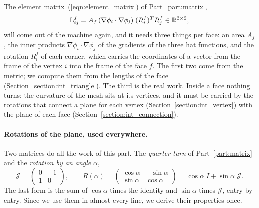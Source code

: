 The element matrix~(\ref{eqn:element_matrix}) of Part~\ref{part:matrix},
\begin{equation*}
\mathrm L^f_{ij} = A_f\,(\nabla\phi_i\cdot\nabla\phi_j)\; (R_i^f)^T R_j^f \in \mathbb{R}^{2\times 2},
\end{equation*}
will come out of the machine again, and it needs three things per face: an area $A_f$, the inner products $\nabla\phi_i \cdot \nabla\phi_j$ of the gradients of the three hat functions, and the rotation $R_i^f$ of each corner, which carries the coordinates of a vector from the frame of the vertex $i$ into the frame of the face $f$. The first two come from the metric; we compute them from the lengths of the face (Section~\ref{section:int_triangle}). The third is the real work. Inside a face nothing turns; the curvature of the mesh sits at its vertices, and it must be carried by the rotations that connect a plane for each vertex (Section~\ref{section:int_vertex}) with the plane of each face (Section~\ref{section:int_connection}).

\paragraph{Rotations of the plane, used everywhere.} Two matrices do all the work of this part. The \emph{quarter turn} of Part~\ref{part:matrix} and the \emph{rotation by an angle} $\alpha$,
\begin{equation}
\label{eqn:s3a_rotation}
\mathcal J = \begin{pmatrix} 0 & -1 \\ 1 & 0 \end{pmatrix}, \qquad R(\alpha) = \begin{pmatrix} \cos\alpha & -\sin\alpha \\ \sin\alpha & \cos\alpha \end{pmatrix} = \cos\alpha\; I + \sin\alpha\; \mathcal J .
\end{equation}
The last form is the sum of $\cos\alpha$ times the identity and $\sin\alpha$ times $\mathcal J$, entry by entry. Since we use them in almost every line, we derive their properties once.

